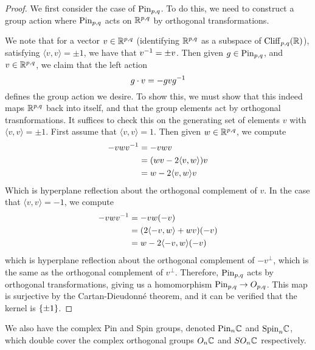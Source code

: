 \begin{proof}
We first consider the case of $\mathrm{Pin}_{p,q}$. To do this, we need to construct
a group action where $\mathrm{Pin}_{p,q}$ acts on $\mathbb{R}^{p,q}$ by orthogonal transformations.
\iffalse
There exists an involution $T : \Cliff_{p,q}(\R) \to \Cliff_{p,q}(\R)$, where given
the standard orthogonal basis $\set{e_1, \ldots, e_{p+1}}$, we define
\[
T(e_{i_1}\cdots e_{i_k}) = e_{i_k}\cdots e_{i_1}
\]
and extending linearly to the remainder of $\Cliff_{p,q}(\R)$. Given $a \in
\Cliff_{p,q}(\R)$, we denote $T(a)$ by $a^T$.
\fi
We note that for a vector
$v \in \mathbb{R}^{p,q}$ (identifying $\mathbb{R}^{p,q}$ as a subspace of $\Cliff_{p,q}(\R)$),
satisfying $\langle v,v \rangle = \pm 1$, we have that
$v^{-1} = \pm v$. Then given $g \in \mathrm{Pin}_{p,q}$, and $v \in \mathbb{R}^{p,q}$, we claim
that the left action
\[
g \cdot v = -gvg^{-1}
\]
defines the group action we desire. To show this, we must show that this indeed
maps $\mathbb{R}^{p,q}$ back into itself, and that the group elements act by orthogonal
trasnformations. It suffices to check this on the generating set of elements
$v$ with $\langle v,v \rangle = \pm 1$. First assume that $\langle v,v \rangle = 1$.
Then given $w \in \mathbb{R}^{p,q}$, we compute
%
\begin{align*}
-vwv^{-1} &= -vwv \\
&= (wv - 2\langle v,w \rangle)v \\
&= w - 2\langle v,w \rangle v
\end{align*}
%
Which is hyperplane reflection about the orthogonal complement of $v$. In the
case that $\langle v,v \rangle = -1$, we compute
%
\begin{align*}
-vwv^{-1} &= -vw(-v) \\
&= (2\langle -v,w\rangle + wv)(-v) \\
&= w - 2\langle -v,w \rangle(-v)
\end{align*}
which is hyperplane reflection about the orthogonal complement of $-v^\perp$,
which is the same as the orthogonal complement of $v^\perp$. Therefore,
$\mathrm{Pin}_{p,q}$ acts by orthogonal transformations, giving us a homomorphism
$\mathrm{Pin}_{p,q} \to O_{p,q}$. This map is surjective by the Cartan-Dieudonn\'e
theorem, and it can be verified that the kernel is $\left\lbrace \pm 1 \right\rbrace$.
%
\end{proof}
%
We also have the complex Pin and Spin groups, denoted $\mathrm{Pin}_n\mathbb{C}$ and $\mathrm{Spin}_n\mathbb{C}$,
which double cover the complex orthogonal groups $O_n\mathbb{C}$ and $SO_n\mathbb{C}$
respectively.\\

